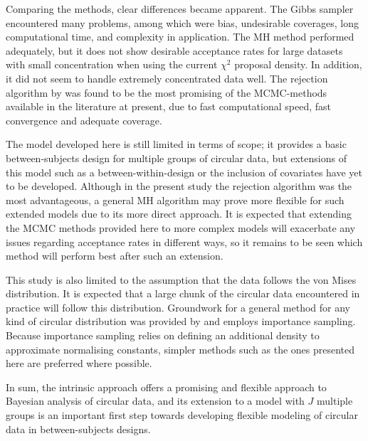 \documentclass[bib]{ba/ba}
\begin{document}
Comparing the methods, clear differences became apparent. The Gibbs sampler encountered many problems, among which were bias, undesirable coverages, long computational time, and complexity in application. The MH method performed adequately, but it does not show desirable acceptance rates for large datasets with small concentration when using the current $\chi^2$ proposal density. In addition, it did not seem to handle extremely concentrated data well. The rejection algorithm by \citet{forbes2014fast} was found to be the most promising of the MCMC-methods available in the literature at present, due to fast computational speed, fast convergence and adequate coverage.

The model developed here is still limited in terms of scope; it provides a basic between-subjects design for multiple groups of circular data, but extensions of this model such as a between-within-design or the inclusion of covariates have yet to be developed. Although in the present study the rejection algorithm was the most advantageous, a general MH algorithm may prove more flexible for such extended models due to its more direct approach. It is expected that extending the MCMC methods provided here to more complex models will exacerbate any issues regarding acceptance rates in different ways, so it remains to be seen which method will perform best after such an extension. 

This study is also limited to the assumption that the data follows the von Mises distribution. It is expected that a large chunk of the circular data encountered in practice will follow this distribution. Groundwork for a general method for any kind of circular distribution was provided by \citet{Bhattacharya2009} and employs importance sampling. Because importance sampling relies on defining an additional density to approximate normalising constants, simpler methods such as the ones presented here are preferred where possible. 

In sum, the intrinsic approach offers a promising and flexible approach to Bayesian analysis of circular data, and its extension to a model with $J$ multiple groups is an important first step towards developing flexible modeling of circular data in between-subjects designs. 



\end{document}
